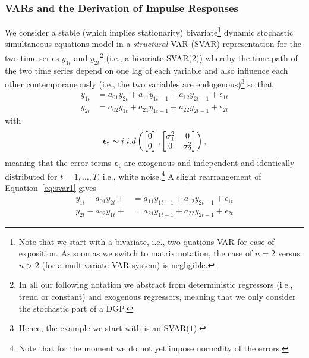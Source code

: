 \documentclass[a4paper,11pt,listof=nochaptergap,oneside,pointednumbers,bibtotoc,bigheadings,liststotoc]{scrbook}
\theoremstyle{mysatz}
\theoremstyle{mydefinition}
\theoremstyle{mybemerkung}
\renewcommand*{\paragraph}[1]{\subsubsection*{#1} \vspace{-3mm}} %
\newcommand{\vect}[1]{\boldsymbol{\mathbf{#1}}}
\begin{document}
\paragraph{VARs and the Derivation of Impulse Responses}
We consider a stable (which implies stationarity) bivariate\footnote{Note that we start with a bivariate, i.e., two-quations-VAR for ease of exposition. As soon as we switch to matrix notation, the case of $n=2$ versus $n>2$ (for a multivariate VAR-system) is negligible.} dynamic stochastic simultaneous equations model in a \textit{structural} VAR (SVAR) representation for the two time series $y_{1t}$ and $y_{2t}$\footnote{In all our following notation we abstract from deterministic regressors (i.e., trend or constant) and exogenous regressors, meaning that we only consider the stochastic part of a DGP.} (i.e., a bivariate SVAR(2)) whereby the time path of the two time series depend on one lag of each variable and also influence each other contemporaneously (i.e., the two variables are endogenous)\footnote{Hence, the example we start with is an SVAR($1$).} so that
\begin{equation} \label{eq:svar1}
\begin{split}
	y_{1t} & = a_{01}y_{2t} + a_{11}y_{1t-1} + a_{12}y_{2t-1} + \epsilon_{1t} \\
	y_{2t} & = a_{02}y_{1t} + a_{21}y_{1t-1} + a_{22}y_{2t-1} + \epsilon_{2t}
\end{split}								
\end{equation}
with 
\begin{equation}
\begin{split}
	\vect{\epsilon_t} \thicksim i.i.d \left (  \begin{bmatrix}
    							0 \\
    							0
 							 \end{bmatrix}, \begin{bmatrix}
    							\sigma_{1}^2 & 0  \\
    							0 & \sigma_{2}^2
 							 \end{bmatrix} \right ),
\end{split}								
\end{equation}
meaning that the error terms $\vect{\epsilon_t}$ are exogenous and independent and identically distributed  for $t = 1, \dots, T$, i.e., white noise.\footnote{Note that for the moment we do not yet impose normality of the errors.} A slight rearrangement of Equation~\ref{eq:svar1} gives 
\begin{equation} \label{eq:svar2}
\begin{split}
	y_{1t} - a_{01}y_{2t} + & = a_{11}y_{1t-1} + a_{12}y_{2t-1} + \epsilon_{1t} \\
	y_{2t} - a_{02}y_{1t} +  & = a_{21}y_{1t-1} + a_{22}y_{2t-1} + \epsilon_{2t}
\end{split}								
\end{equation}
\end{document}
